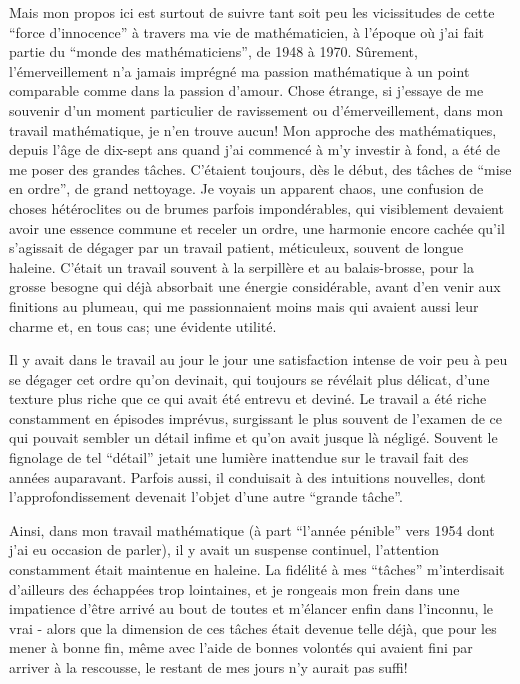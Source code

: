 Mais mon propos ici est surtout de suivre tant soit peu les vicissitudes de cette ``force d'innocence'' à travers ma vie de mathématicien, à l'époque où j'ai fait partie du ``monde des mathématiciens'', de 1948 à 1970. Sûrement, l'émerveillement n'a jamais imprégné ma passion mathématique à un point comparable comme dans la passion d'amour. Chose étrange, si j'essaye de me souvenir d'un moment particulier de ravissement ou d'émerveillement, dans mon travail mathématique, je n'en trouve aucun! Mon approche des mathématiques, depuis l'âge de dix-sept ans quand j'ai commencé à m'y investir à fond, a été de me poser des grandes tâches. C'étaient toujours, dès le début, des tâches de ``mise en ordre'', de grand nettoyage. Je voyais un apparent chaos, une confusion de choses hétéroclites ou de brumes parfois impondérables, qui visiblement devaient avoir une essence commune et receler un ordre, une harmonie encore cachée qu'il s'agissait de dégager par un travail patient, méticuleux, souvent de longue haleine. C'était un travail souvent à la serpillère et au balais-brosse, pour la grosse besogne qui déjà absorbait une énergie considérable, avant d'en venir aux finitions au plumeau, qui me passionnaient moins mais qui avaient aussi leur charme et, en tous cas; une évidente utilité.

Il y avait dans le travail au jour le jour une satisfaction intense de voir peu à peu se dégager cet ordre qu'on devinait, qui toujours se révélait plus délicat, d'une texture plus riche que ce qui avait été entrevu et deviné. Le travail a été riche constamment en épisodes imprévus, surgissant le plus souvent de l'examen de ce qui pouvait sembler un détail infime et qu'on avait jusque là négligé. Souvent le fignolage de tel ``détail'' jetait une lumière inattendue sur le travail fait des années auparavant. Parfois aussi, il conduisait à des intuitions nouvelles, dont l'approfondissement devenait l'objet d'une autre ``grande tâche''.

Ainsi, dans mon travail mathématique (à part ``l'année pénible'' vers 1954 dont j'ai eu occasion de parler), il y avait un suspense continuel, l'attention constamment était maintenue en haleine. La fidélité à mes ``tâches'' m'interdisait d'ailleurs des échappées trop lointaines, et je rongeais mon frein dans une impatience d'être arrivé au bout de toutes et m'élancer enfin dans l'inconnu, le vrai - alors que la dimension de ces tâches était devenue telle déjà, que pour les mener à bonne fin, même avec l'aide de bonnes volontés qui avaient fini par arriver à la rescousse, le restant de mes jours n'y aurait pas suffi!

